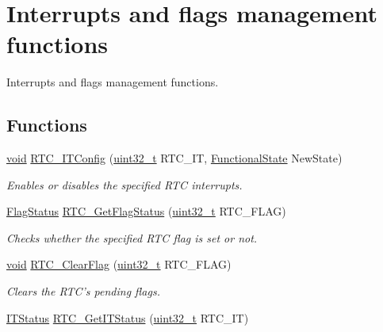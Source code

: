 \hypertarget{group___r_t_c___group13}{\section{Interrupts and flags management functions}
\label{group___r_t_c___group13}
}


Interrupts and flags management functions.  


\subsection*{Functions}
\begin{DoxyCompactItemize}
\item 
\hyperlink{group___n_a_m_e_ga18028b8badbf1ea7e704ccac3c488e82}{void} \hyperlink{group___r_t_c___group13_gaa8469b33b3a99025baf52f007683b925}{R\-T\-C\-\_\-\-I\-T\-Config} (\hyperlink{stdint_8h_a435d1572bf3f880d55459d9805097f62}{uint32\-\_\-t} R\-T\-C\-\_\-\-I\-T, \hyperlink{group___exported__types_gac9a7e9a35d2513ec15c3b537aaa4fba1}{Functional\-State} New\-State)
\begin{DoxyCompactList}\small\item\em Enables or disables the specified R\-T\-C interrupts. \end{DoxyCompactList}\item 
\hyperlink{group___exported__types_ga89136caac2e14c55151f527ac02daaff}{Flag\-Status} \hyperlink{group___r_t_c___group13_gaf2a7f11aa7160e95650fd10845e7780b}{R\-T\-C\-\_\-\-Get\-Flag\-Status} (\hyperlink{stdint_8h_a435d1572bf3f880d55459d9805097f62}{uint32\-\_\-t} R\-T\-C\-\_\-\-F\-L\-A\-G)
\begin{DoxyCompactList}\small\item\em Checks whether the specified R\-T\-C flag is set or not. \end{DoxyCompactList}\item 
\hyperlink{group___n_a_m_e_ga18028b8badbf1ea7e704ccac3c488e82}{void} \hyperlink{group___r_t_c___group13_ga9be3325e05418d05c8c5a5ad369c7d50}{R\-T\-C\-\_\-\-Clear\-Flag} (\hyperlink{stdint_8h_a435d1572bf3f880d55459d9805097f62}{uint32\-\_\-t} R\-T\-C\-\_\-\-F\-L\-A\-G)
\begin{DoxyCompactList}\small\item\em Clears the R\-T\-C's pending flags. \end{DoxyCompactList}\item 
\hyperlink{group___exported__types_gaacbd7ed539db0aacd973a0f6eca34074}{I\-T\-Status} \hyperlink{group___r_t_c___group13_gaab81adc6d2a5a5c1e37a49707c6bf640}{R\-T\-C\-\_\-\-Get\-I\-T\-Status} (\hyperlink{stdint_8h_a435d1572bf3f880d55459d9805097f62}{uint32\-\_\-t} R\-T\-C\-\_\-\-I\-T)

\end{DoxyCompactItemize}
